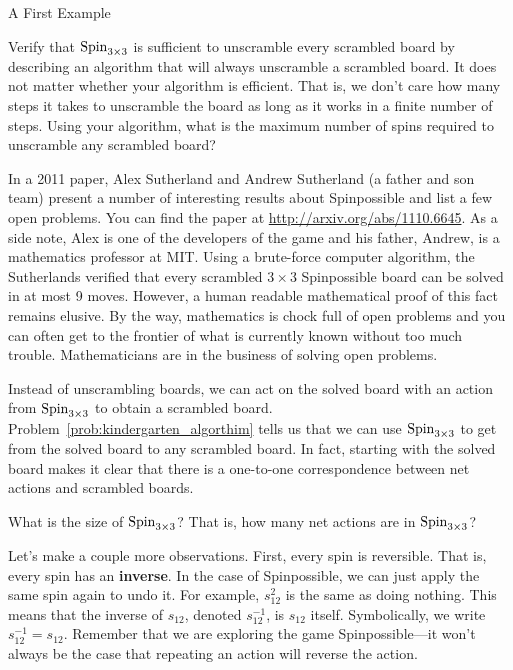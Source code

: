 \begin{section}{A First Example}
\begin{problem}\label{prob:kindergarten_algorthim}
Verify that $\operatorname{Spin}_{3\times 3}$ is sufficient to unscramble every scrambled board by describing an algorithm that will always unscramble a scrambled board.  It does not matter whether your algorithm is efficient.  That is, we don't care how many steps it takes to unscramble the board as long as it works in a finite number of steps.  Using your algorithm, what is the maximum number of spins required to unscramble any scrambled board?
\end{problem}

In a 2011 paper, Alex Sutherland and Andrew Sutherland (a father and son team) present a number of interesting results about Spinpossible and list a few open problems. You can find the paper at \url{http://arxiv.org/abs/1110.6645}. As a side note, Alex is one of the developers of the game and his father, Andrew, is a mathematics professor at MIT. Using a brute-force computer algorithm, the Sutherlands verified that every scrambled $3\times 3$ Spinpossible board can be solved in at most 9 moves. However, a human readable mathematical proof of this fact remains elusive.  By the way, mathematics is chock full of open problems and you can often get to the frontier of what is currently known without too much trouble.  Mathematicians are in the business of solving open problems.

Instead of unscrambling boards, we can act on the solved board with an action from $\operatorname{Spin}_{3\times 3}$ to obtain a scrambled board.  Problem~\ref{prob:kindergarten_algorthim} tells us that we can use $\operatorname{Spin}_{3\times 3}$ to get from the solved board to any scrambled board. In fact, starting with the solved board makes it clear that there is a one-to-one correspondence between net actions and scrambled boards.

\begin{problem}
What is the size of $\operatorname{Spin}_{3\times 3}$? That is, how many net actions are in $\operatorname{Spin}_{3\times 3}$?
\end{problem}

Let's make a couple more observations.  First, every spin is reversible. That is, every spin has an \textbf{inverse}.  In the case of Spinpossible, we can just apply the same spin again to undo it.  For example, $s_{12}^2$ is the same as doing nothing. This means that the inverse of $s_{12}$, denoted $s_{12}^{-1}$, is $s_{12}$ itself. Symbolically, we write $s_{12}^{-1}=s_{12}$. Remember that we are exploring the game Spinpossible---it won't always be the case that repeating an action will reverse the action. 


\end{section}
